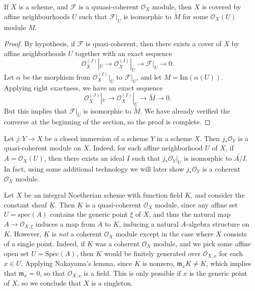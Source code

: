 \begin{lemma}
    If $X$ is a scheme, and $\mathcal{F}$ is a quuasi-coherent $\mathcal{O}_X$ module, then $X$ is covered by affine neighbourhoods $U$ such that $\mathcal{F}|_U$ is isomorphic to $\tilde{M}$ for some $\mathcal{O}_X(U)$ module $M$.
\end{lemma}
\begin{proof}
    By hypothesis, if $\mathcal{F}$ is quasi-coherent, then there exists a cover of $X$ by affine neighborhoods $U$ together with an exact sequence
    \[ \mathcal{O}_X^{(J)}|_U \to \mathcal{O}_X^{(I)}|_U \to \mathcal{F}|_U \to 0. \]
    Let $\alpha$ be the morphism from $\mathcal{O}_X^{(I)}|_U$ to $\mathcal{F}|_U$, and let $M = \text{Im}(\alpha(U))$. Applying right exactness, we have an exact sequence
    \[ \mathcal{O}_X^{(J)}|_U \to \mathcal{O}_X^{(I)}|_U \to \widetilde{M} \to 0. \]
    But this implies that $\mathcal{F}|_U$ is isomorphic to $\widetilde{M}$. We have already verified the converse at the beginning of the section, so the proof is complete.
\end{proof}

\begin{example}
    Let $j: Y \to X$ be a closed immersion of a scheme $Y$ in a scheme $X$. Then $j_* \mathcal{O}_Y$ is a quasi-coherent module on $X$. Indeed, for each affine neighborhood $U$ of $X$, if $A = \mathcal{O}_X(U)$, then there exists an ideal $I$ such that $j_* \mathcal{O}_Y|_U$ is isomorphic to $\widetilde{A/I}$. In fact, using some additional technology we will later show $j_* \mathcal{O}_Y$ is a coherent $\mathcal{O}_X$ module.
\end{example}

\begin{example}
    Let $X$ be an integral Noetherian scheme with function field $K$, and consider the constant sheaf $\underline{K}$. Then $\underline{K}$ is a quasi-coherent $\mathcal{O}_X$ module, since any affine set $U = \text{spec}(A)$ contains the generic point $\xi$ of $X$, and thus the natural map $A \to \mathcal{O}_{X,\xi}$ induces a map from $A$ to $K$, inducing a natural $A$-algebra structure on $K$. However, $\underline{K}$ is \emph{not} a coherent $\mathcal{O}_X$ module except in the case where $X$ consists of a single point. Indeed, if $\underline{K}$ was a coherent $\mathcal{O}_X$ module, and we pick some affine open set $U = \text{Spec}(A)$, then $K$ would be finitely generated over $\mathcal{O}_{X,x}$ for each $x \in U$. Applying Nakayama's lemma, since $K$ is nonzero, $\mathfrak{m}_x K \neq K$, which implies that $\mathfrak{m}_x = 0$, so that $\mathcal{O}_{X,x}$ is a field. This is only possible if $x$ is the generic point of $X$, so we conclude that $X$ is a singleton.
\end{example}


